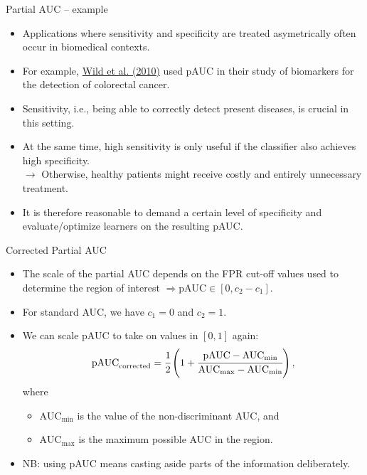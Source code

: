 \documentclass[11pt,compress,t,notes=noshow, xcolor=table]{beamer}
\begin{document}
\begin{vbframe}{Partial AUC -- example}

\begin{itemize}
  \item Applications where sensitivity and specificity are treated asymetrically 
  often occur in biomedical contexts.
  \item For example, 
  \href{https://clincancerres.aacrjournals.org/content/16/24/6111}
  {Wild et al. (2010)} used pAUC in their study of biomarkers for the detection 
  of colorectal cancer.
  \item Sensitivity, i.e., being able to correctly detect present diseases, is 
  crucial in this setting.
  \item At the same time, high sensitivity is only useful if the classifier also 
  achieves high specificity. \\
  $\rightarrow$ Otherwise, healthy patients might receive costly and entirely 
  unnecessary treatment.
  \item It is therefore reasonable to demand a certain level of specificity and 
  evaluate/optimize learners on the resulting pAUC.
\end{itemize}

\end{vbframe}


\begin{vbframe}{Corrected Partial AUC}

\begin{itemize}
  \item The scale of the partial AUC depends on the FPR cut-off values used to 
  determine the region of interest $\Rightarrow \text{pAUC} \in [0, c_2 - c_1]$.
  \item For standard AUC, we have $c_1 = 0$ and $c_2 = 1$.
  \item We can scale pAUC to take on values in $[0, 1]$ again:
  $$\text{pAUC}_\text{corrected} = \cfrac{1}{2} \left( 1 + \cfrac{\text{pAUC} - 
  \text{AUC}_{\text{min}}}{\text{AUC}_{\text{max}} - \text{AUC}_{\text{min}}} 
  \right),$$
  where
  \begin{itemize}
    \item $\text{AUC}_{\text{min}}$ is the value of the non-discriminant AUC, 
    and
    \item $\text{AUC}_{\text{max}}$ is the maximum possible AUC in the region.
  \end{itemize}
  \lz
  \item NB: using pAUC means casting aside parts of the information 
  deliberately.
\end{itemize}

\end{vbframe}
\end{document}
